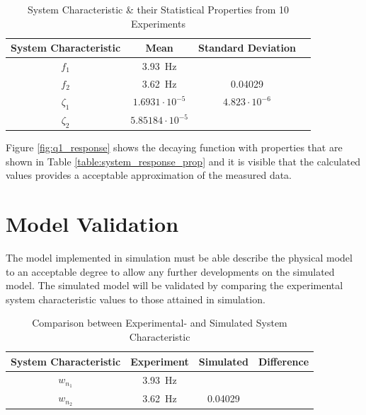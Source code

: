 \begin{table}[]
	\centering
	\begin{tabular}{|c|c|c|c|}
		\hline
		System Characteristic & Mean & Standard Deviation\\
		\hline
		\hline
		$f_{1}$ & \SI{3.93}{Hz} &  \\
		\hline
		$f_{2}$ & \SI{3.62}{Hz} & 0.04029 \\ 
		\hline
		$\zeta_{1}$ & $1.6931 \cdot10^{-5}$ & $4.823\cdot 10^{-6}$
		\\
		\hline
		$\zeta_{2}$ & $5.85184 \cdot 10^{-5}$ & \\
		\hline
	\end{tabular}
	\caption{System Characteristic \& their Statistical Properties from 10 Experiments}
	\label{table:system_characteristic}
\end{table}

Figure \ref{fig:q1_response} shows the decaying function with properties that are shown in Table \ref{table:system_response_prop} and it is visible that the calculated values provides a acceptable approximation of the measured data.

\section{Model Validation}
The model implemented in simulation must be able describe the physical model to an acceptable degree to allow any further developments on the simulated model. The simulated model will be validated by comparing the experimental system characteristic values to those attained in simulation.
 
\begin{table}[]
	\centering
	\begin{tabular}{|c|c|c|c|}
		\hline
		System Characteristic & Experiment & Simulated & Difference\\
		\hline
		\hline
		$w_{{n}_{1}}$ & \SI{3.93}{Hz} & & \\
		\hline
		$w_{{n}_{2}}$ & \SI{3.62}{Hz} & 0.04029 &\\ 
		\hline
	\end{tabular}
	\caption{Comparison between Experimental- and Simulated System Characteristic}
	\label{table:simulate_vs_experiment}
\end{table}
